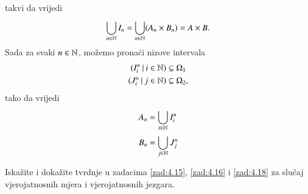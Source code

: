 \begin{rj}[\ref{zad:4.18}]
\begin{enumerate}[label=(\roman*)]
\begin{equation*}
            \end{equation*}
            takvi da vrijedi
            \begin{equation*}
                \bigcup\limits_{n \in \mathbb{N}}^{} I_n = \bigcup\limits_{n \in \mathbb{N}}^{} (A_n \times B_n) = A \times B.
            \end{equation*}
            Sada za svaki $n \in \mathbb{N}$, mo\v zemo prona\' ci nizove intervala
            \begin{equation*}
                \begin{aligned}
                    ({I^n_i} \: | \: {i \in \mathbb{N}}) &\subseteq \Omega_1\\
                    ({J^n_i} \: | \: {j \in \mathbb{N}}) &\subseteq \Omega_2,
                \end{aligned}
            \end{equation*}
            tako da vrijedi
            \begin{equation*}
                \begin{aligned}
                    A_n &= \bigcup\limits_{i \in \mathbb{N}}^{} I^n_i\\
                    B_n &= \bigcup\limits_{j \in \mathbb{N}}^{} J^n_j
                \end{aligned}
            \end{equation*}
    \end{enumerate}
\end{rj}

\begin{zad} \label{zad:4.19}
    Iska\v zite i doka\v zite tvrdnje u zadacima \ref{zad:4.15}, \ref{zad:4.16} i \ref{zad:4.18} za slu\v caj vjerojatnosnih mjera i vjerojatnosnih jezgara.
\end{zad}


